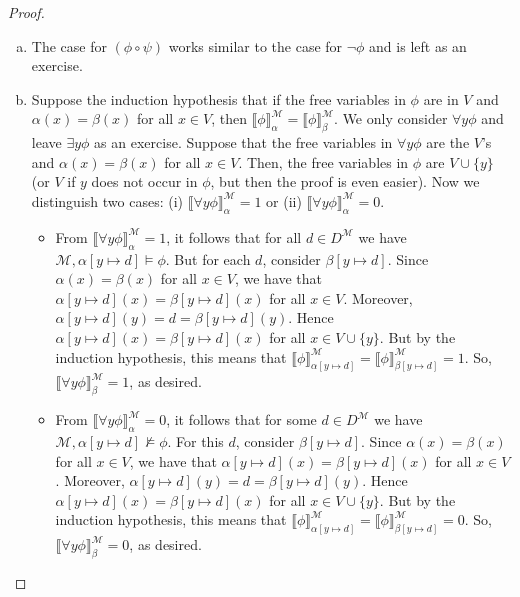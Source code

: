 \begin{enumerate}[\thesection.1]
\begin{proof}
\begin{enumerate}[(i)]
\begin{enumerate}[(a)]
			\item The case for $(\phi\circ \psi)$ works similar to the case for $\neg\phi$ and is left as an exercise.
			
			\item Suppose the induction hypothesis that if the free variables in $\phi$ are in $V$ and $\alpha(x)=\beta(x)$ for all $x\in V$, then $\llbracket\phi\rrbracket_\alpha^\mathcal{M}=\llbracket\phi\rrbracket_\beta^\mathcal{M}$. We only consider $\forall y\phi$ and leave $\exists y\phi$ as an exercise. Suppose that the free variables in $\forall y\phi$ are the $V$'s and $\alpha(x)=\beta(x)$ for all $x\in V$. Then, the free variables in $\phi$ are $V\cup\{y\}$ (or $V$ if $y$ does not occur in $\phi$, but then the proof is even easier). Now we distinguish two cases: (i) $\llbracket\forall y\phi\rrbracket_\alpha^\mathcal{M}=1$ or (ii)  $\llbracket\forall y\phi\rrbracket_\alpha^\mathcal{M}=0$. 
			
			\begin{itemize}
			
				\item From $\llbracket\forall y\phi\rrbracket_\alpha^\mathcal{M}=1$, it follows that for all $d\in D^\mathcal{M}$ we have $\mathcal{M},\alpha[y\mapsto d]\vDash\phi$. But for each $d$, consider $\beta[y\mapsto d]$. Since $\alpha(x)=\beta(x)$ for all $x\in V$, we have that $\alpha[y\mapsto d](x)=\beta[y\mapsto d](x)$ for all $x\in V$. Moreover, $\alpha[y\mapsto d](y)=d=\beta[y\mapsto d](y)$. Hence $\alpha[y\mapsto d](x)=\beta[y\mapsto d](x)$ for all $x\in V\cup\{y\}$. But by the induction hypothesis, this means that $\llbracket\phi\rrbracket_{\alpha[y\mapsto d]}^\mathcal{M}=\llbracket\phi\rrbracket_{\beta[y\mapsto d]}^\mathcal{M}=1$. So, $\llbracket\forall y\phi\rrbracket_\beta^\mathcal{M}=1$, as desired.
				
			  \item  From $\llbracket\forall y\phi\rrbracket_\alpha^\mathcal{M}=0$,
				it follows that for some
				$d\in D^\mathcal{M}$
				we have
				$\mathcal{M},\alpha[y\mapsto d]\nvDash\phi$.
				For this $d$,
				consider
				$\beta[y\mapsto d]$.
				Since
				$\alpha(x)=\beta(x)$
				for all $x\in V$,
				we have that
				$\alpha[y\mapsto d](x)=\beta[y\mapsto d](x)$
				for all $x\in V$.
				Moreover,
				$\alpha[y\mapsto d](y)=d=\beta[y\mapsto d](y)$.
				Hence
				$\alpha[y\mapsto d](x)=\beta[y\mapsto d](x)$
				for all
				$x\in V\cup\{y\}$.
				But by the induction hypothesis, this means that
				$\llbracket\phi\rrbracket_{\alpha[y\mapsto d]}^\mathcal{M}=\llbracket\phi\rrbracket_{\beta[y\mapsto d]}^\mathcal{M}=0$.
				So,
				$\llbracket\forall y\phi\rrbracket_\beta^\mathcal{M}=0$,
				as desired.
				

\end{itemize}
\end{enumerate}
\end{enumerate}
\end{proof}
\end{enumerate}
